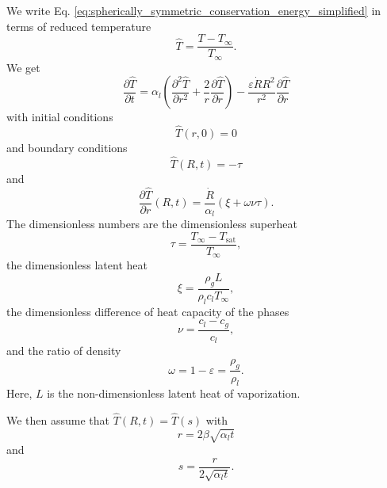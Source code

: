 \documentclass{article}
\numberwithin{equation}{section}
\newcommand{\pd}[2]{\dfrac{\partial #1}{\partial #2}}
\newcommand{\pdd}[2]{\dfrac{\partial^2 #1}{\partial #2^2}}
\newcommand{\dimless}[1]{\hat{#1}}
\begin{document}
We write Eq. \eqref{eq:spherically_symmetric_conservation_energy_simplified} in terms of reduced temperature
\begin{equation}
    \dimless{T} = \frac{T - T_\infty}{T_\infty}.
\end{equation}
We get
\begin{equation}
    \pd{\dimless{T}}{t}
    =
    \alpha_l \left(
        \pdd{\dimless{T}}{r} +
        \frac{2}{r} \pd{\dimless{T}}{r}
    \right)
    - \frac{\varepsilon \dot{R} R^2}{r^2} \pd{\dimless{T}}{r}
    \label{eq:spherically_symmetric_conservation_energy_dimless}
\end{equation}
with initial conditions
\begin{equation}
    \dimless{T}(r, 0) = 0
\end{equation}
and boundary conditions
\begin{equation}
    \dimless{T}(R, t) = -\tau
\end{equation}
and
\begin{equation}
    \pd{\dimless{T}}{r}(R, t) = \frac{\dot{R}}{\alpha_l} \left(\xi + \omega \nu \tau\right).
\end{equation}
The dimensionless numbers are
the dimensionless superheat
\begin{equation}
    \tau = \frac{T_\infty - T_\text{sat}}{T_\infty},
    \label{eq:dimensionless_superheat}
\end{equation}
the dimensionless latent heat
\begin{equation}
    \xi = \frac{\rho_g L}{\rho_l c_l T_\infty},
    \label{eq:dimensionless_latent_heat}
\end{equation}
the dimensionless difference of heat capacity of the phases
\begin{equation}
    \nu = \frac{c_l - c_g}{c_l},
    \label{eq:dimensionless_diff_heat_capacity}
\end{equation}
and the ratio of density
\begin{equation}
    \omega = 1 - \varepsilon = \frac{\rho_g}{\rho_l}.
    \label{eq:ratio_density}
\end{equation}
Here, $L$ is the non-dimensionless latent heat of vaporization.

We then assume that $\dimless{T}(R, t) = \dimless{T}(s)$ with
\begin{equation}
    r = 2 \beta \sqrt{\alpha_l t}
    \label{eq:similarity_r}
\end{equation}
and
\begin{equation}
    s = \frac{r}{2 \sqrt{\alpha_l t}}.
    \label{eq:similarity_s}
\end{equation}
\end{document}
